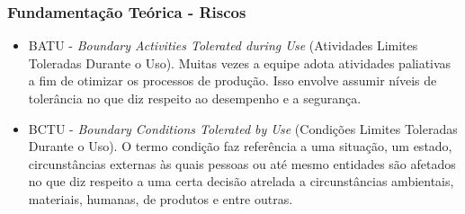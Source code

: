 \documentclass{beamer}
\begin{document}
\begin{frame}
	\frametitle{Fundamentação Teórica - Riscos}
	\begin{itemize}
		\item BATU - \textit{Boundary Activities Tolerated during Use} (Atividades Limites Toleradas Durante o Uso). Muitas vezes a equipe adota atividades paliativas a fim de otimizar os processos de produção. Isso envolve assumir níveis de tolerância no que diz respeito ao desempenho e a segurança. 
		\item BCTU - \textit{Boundary Conditions Tolerated by Use} (Condições Limites Toleradas Durante o Uso). O termo condição faz referência a uma situação, um estado, circunstâncias externas às quais pessoas ou até mesmo entidades são afetados no que diz respeito a uma certa decisão atrelada a circunstâncias ambientais, materiais, humanas, de produtos e entre outras.
	\end{itemize}
\end{frame}
\end{document}
